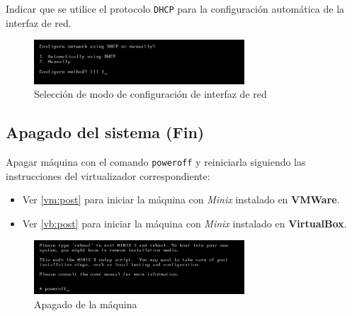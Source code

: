 \documentclass[12pt]{scrartcl}
\begin{document}
Indicar que se utilice el protocolo \texttt{DHCP} para la configuración automática de la interfaz de red.
\begin{figure}[H]
  \centering
  \includegraphics[width=0.7\textwidth]{vm/min30.png}
  \caption{Selección de modo de configuración de interfaz de red}
\end{figure}

\subsection{Apagado del sistema (Fin)}
Apagar máquina con el comando \texttt{poweroff} y reiniciarla siguiendo las instrucciones del virtualizador correspondiente:
\begin{itemize}
\item Ver \ref{vm:post} para iniciar la máquina con \textit{Minix} instalado en \textbf{VMWare}.
\item Ver \ref{vb:post} para iniciar la máquina con \textit{Minix} instalado en \textbf{VirtualBox}.
\end{itemize}
\begin{figure}[H]
  \centering
  \includegraphics[width=0.7\textwidth]{vm/min31.png}
  \caption{Apagado de la máquina}
\end{figure}
\end{document}
